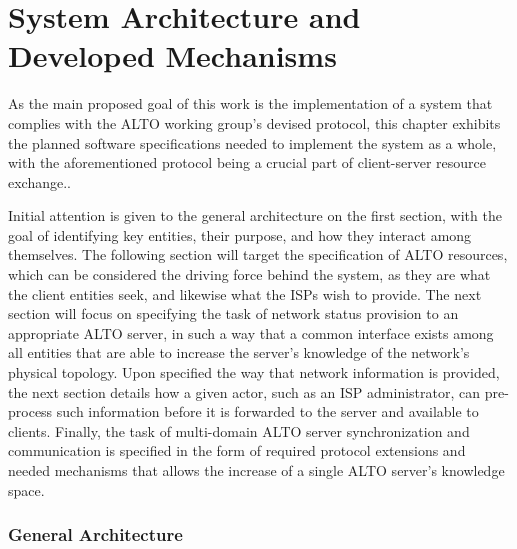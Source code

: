 \chapter{System Architecture and Developed Mechanisms}

    As the main proposed goal of this work is the implementation of a system that complies with the ALTO working group's devised protocol, this chapter exhibits the planned software specifications needed to implement the system as a whole, with the aforementioned protocol being a crucial part of client-server resource exchange..

    Initial attention is given to the general architecture on the first section, with the goal of identifying key entities, their purpose, and how they interact among themselves.
    The following section will target the specification of ALTO resources, which can be considered the driving force behind the system, as they are what the client entities seek, and likewise what the ISPs wish to provide.
    The next section will focus on specifying the task of network status provision to an appropriate ALTO server, in such a way that a common interface exists among all entities that are able to increase the server's knowledge of the network's physical topology.
    Upon specified the way that network information is provided, the next section details how a given actor, such as an ISP administrator, can pre-process such information before it is forwarded to the server and available to clients.
    Finally, the task of multi-domain ALTO server synchronization and communication is specified in the form of required protocol extensions and needed mechanisms that allows the increase of a single ALTO server's knowledge space.

\subsection{General Architecture}

